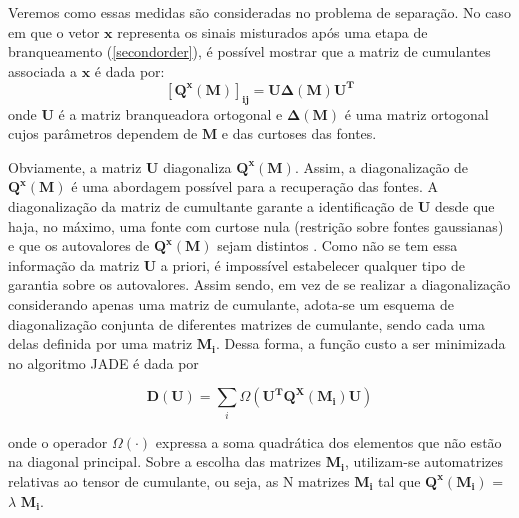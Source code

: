     Veremos como essas medidas são consideradas no problema de separação. No caso em que o vetor $\mathbf{x}$ representa os sinais misturados após uma etapa de branqueamento (\ref{secondorder}), é possível mostrar \cite{ICA3} que a matriz de cumulantes associada a $\mathbf{x}$ é dada por:
    \begin{equation}
        \mathbf{[Q^x(M)]_{ij}} = \mathbf{U\Delta(M)U^T}
    \end{equation}
    onde $\mathbf{U}$ é a matriz branqueadora ortogonal e  $\mathbf{\Delta(M)}$ é uma matriz ortogonal cujos parâmetros dependem de $\mathbf{M}$ e das curtoses das fontes.

    Obviamente, a matriz $\mathbf{U}$ diagonaliza  $\mathbf{Q^x(M)}$. Assim, a diagonalização de $\mathbf{Q^x(M)}$ é uma abordagem possível para a recuperação das fontes.  A diagonalização da matriz de cumultante garante a identificação de $\mathbf{U}$ desde que haja, no máximo, uma fonte com curtose nula (restrição sobre fontes gaussianas) e que os autovalores de $\mathbf{Q^x(M)}$ sejam distintos \cite{JADE}. Como não se tem essa informação da matriz $\mathbf{U}$ a priori, é impossível estabelecer qualquer tipo de garantia sobre os autovalores.
    Assim sendo, em vez de se realizar a diagonalização considerando apenas uma matriz de cumulante, adota-se um esquema de diagonalização conjunta de diferentes matrizes de cumulante, sendo cada uma delas definida por uma matriz $\mathbf{M_i}$. Dessa forma, a função custo a ser minimizada no algoritmo JADE é dada por
    
    \begin{equation}\label{eq:optimize}
        \mathbf{D(U)} = \sum_i \Omega(\mathbf{U^TQ^X(M_i)U})
    \end{equation}
    
    onde o operador $\Omega(\cdot)$ expressa a soma quadrática dos elementos que não estão na diagonal principal. Sobre a escolha das matrizes $\mathbf{M_i}$, utilizam-se automatrizes relativas ao tensor de cumulante, ou seja, as N matrizes $\mathbf{M_i}$ tal que $\mathbf{Q^x(M_i)}$ = $\lambda$ $\mathbf{M_i}$.
    
